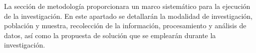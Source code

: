 La sección de metodología proporcionara un marco sistemático para la ejecución de la investigación. En este apartado se detallarán la modalidad de investigación, población y muestra, recolección de la información, procesamiento y análisis de datos, así como la propuesta de solución que se emplearán durante la investigación.
